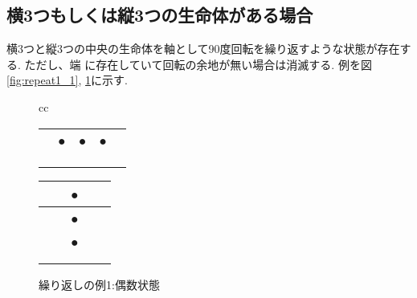 \documentclass[a4J, 12pt]{jsarticle}
\begin{document}
\subsection{横3つもしくは縦3つの生命体がある場合}
横3つと縦3つの中央の生命体を軸として90度回転を繰り返すような状態が存在する. ただし、端
に存在していて回転の余地が無い場合は消滅する. 例を図\ref{fig:repeat1_1}, \ref{fig:repeat1_2}に示す.
\begin{figure}[tbp]
    \centering
    \begin{tabular}{cc}
        \begin{minipage}[c]{0.5\hsize}
            \centering
            \begin{tabular}{|p{1em}|p{1em}|p{1em}|p{1em}|p{1em}|} \hline
                & & & & \\ \hline
                & ● & ● & ● & \\ \hline
                & & & & \\ \hline
                & & & & \\ \hline
                & & & & \\ \hline
            \end{tabular}
            \caption{繰り返しの例1:奇数状態}
            \label{fig:repeat1_1}
        \end{minipage}
        \begin{minipage}[c]{0.5\hsize}
            \centering
            \begin{tabular}{|p{1em}|p{1em}|p{1em}|p{1em}|p{1em}|} \hline
                & & ● & & \\ \hline
                & & ● & & \\ \hline
                & & ● & & \\ \hline
                & & & & \\ \hline
                & & & & \\ \hline
            \end{tabular}
            \caption{繰り返しの例1:偶数状態}
            \label{fig:repeat1_2}
        \end{minipage}
    \end{tabular}
\end{figure}

\end{document}
